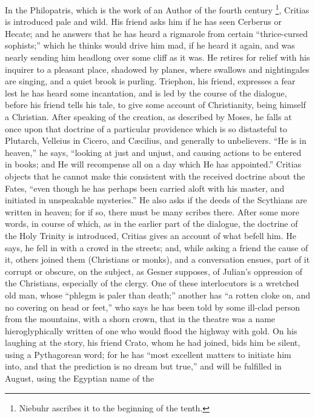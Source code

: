 In the Philopatris, which is the work of an Author of
the fourth century \footnote{Niebuhr ascribes it to the
beginning of the tenth.}, Critias is introduced pale
and wild. His friend asks him if he has seen Cerberus or
Hecate; and he answers that he has heard a rigmarole from
certain ``thrice-cursed sophists;'' which he
thinks would drive him mad, if he heard it again, and was
nearly sending him headlong over some cliff as it was. He
retires for relief with his inquirer to a pleasant place,
shadowed by planes, where swallows and nightingales are
singing, and a quiet brook is purling. Triephon, his
friend, expresses a fear lest he has heard some incantation, and is led by the course of the dialogue,
before his friend tells his tale, to give some account of
Christianity, being himself a Christian. After speaking
of the creation, as described by Moses, he falls at once
upon that doctrine of a particular providence which is so
distasteful to Plutarch, Velleius in Cicero, and Cæcilius, and generally to unbelievers. ``He is in
heaven,'' he says, ``looking at just and unjust, and
causing actions to be entered in books; and He will
recompense all on a day which He has appointed.''
Critias objects that he cannot make this consistent with
the received doctrine about the Fates, ``even though
he has perhaps been carried aloft with his master, and
initiated in unspeakable mysteries.'' He also asks if
the deeds of the Scythians are written in heaven; for if
so, there must be many scribes there. After some more
words, in course of which, as in the earlier part of the
dialogue, the doctrine of the Holy Trinity is introduced,
Critias gives an account of what befell him. He says, he
fell in with a crowd in the streets; and, while asking a
friend the cause of it, others joined them (Christians or
monks), and a conversation ensues, part of it corrupt or
obscure, on the subject, as Gesner supposes, of Julian's
oppression of the Christians, especially of the clergy.
One of these interlocutors is a wretched old man, whose
``phlegm is paler than death;'' another has
``a rotten cloke on, and no covering on head or
feet,'' who says he has been told by some ill-clad
person from the mountains, with a shorn crown, that in
the theatre was a name hieroglyphically written of one
who would flood the highway with gold. On his laughing at
the story, his friend Crato, whom he had joined, bids him
be silent, using a Pythagorean word; for he has
``most excellent matters to initiate him into, and
that the prediction is no dream but true,'' and will
be fulfilled in August, using the Egyptian name of the

